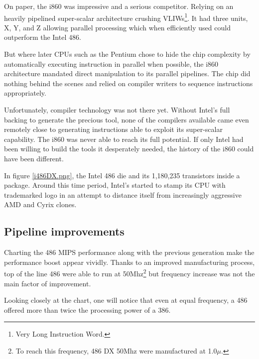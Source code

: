 On paper, the i860 was impressive and a serious competitor. Relying on an heavily pipelined super-scalar architecture crushing VLIWs\footnote{Very Long Instruction Word.}. It had three units, X, Y, and Z allowing parallel processing which when efficiently used could outperform the Intel 486.\\
\par
But where later CPUs such as the Pentium chose to hide the chip complexity by automatically executing instruction in parallel when possible, the i860 architecture mandated direct manipulation to its parallel pipelines. The chip did nothing behind the scenes and relied on compiler writers to sequence instructions appropriately.\\
\par
Unfortunately, compiler technology was not there yet. Without Intel's full backing to generate the precious tool, none of the compilers available came even remotely close to generating instructions able to exploit its super-scalar capability. The i860 was never able to reach its full potential. If only Intel had been willing to build the tools it desperately needed, the history of the i860 could have been different.\\
\par
\par
{}
\par
In figure \ref{i486DX.png}, the Intel 486 die and its 1,180,235 transistors inside a package. Around this time period, Intel's started to stamp its CPU with trademarked logo in an attempt to distance itself from increasingly aggressive AMD and Cyrix clones.\\
\par
{}

\par
\subsection{Pipeline improvements}
Charting the 486 MIPS performance along with the previous generation make the performance boost appear vividly. Thanks to an improved manufacturing process, top of the line 486 were able to run at 50Mhz\footnote{To reach this frequency, 486 DX 50Mhz were manufactured at 1.0$\mu$.} but frequency increase was not the main factor of improvement.\\
\par
 Looking closely at the chart, one will notice that even at equal frequency, a 486 offered more than twice the processing power of a 386.\\

